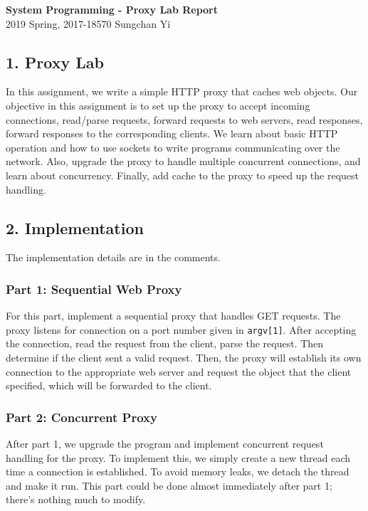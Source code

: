 \documentclass[12pt]{report}
\begin{document}
\begin{center}
\textbf{\Large System Programming - Proxy Lab Report}\\
\large 2019 Spring, 2017-18570 Sungchan Yi
\end{center}
\subsection*{1. Proxy Lab}
In this assignment, we write a simple HTTP proxy that caches web objects. Our objective in this assignment is to set up the proxy to accept incoming connections, read/parse requests, forward requests to web servers, read responses, forward responses to the corresponding clients. We learn about basic HTTP operation and how to use sockets to write programs communicating over the network. Also, upgrade the proxy to handle multiple concurrent connections, and learn about concurrency. Finally, add cache to the proxy to speed up the request handling.
\subsection*{2. Implementation}
The implementation details are in the comments.
\subsubsection*{Part 1: Sequential Web Proxy}
For this part, implement a sequential proxy that handles GET requests. The proxy listens for connection on a port number given in \texttt{argv[1]}. After accepting the connection, read the request from the client, parse the request. Then determine if the client sent a valid request. Then, the proxy will establish its own connection to the appropriate web server and request the object that the client specified, which will be forwarded to the client.
\subsubsection*{Part 2: Concurrent Proxy}
After part 1, we upgrade the program and implement concurrent request handling for the proxy. To implement this, we simply create a new thread each time a connection is established. To avoid memory leaks, we detach the thread and make it run. This part could be done almost immediately after part 1; there's nothing much to modify.
\end{document}
